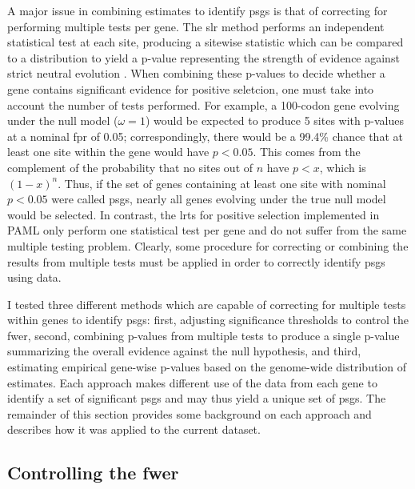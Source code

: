 A major issue in combining \sw estimates to identify \acp{psg} is that
of correcting for performing multiple \sw tests per gene. The \ac{slr}
method performs an independent statistical test at each site,
producing a sitewise statistic which can be compared to a \chisq
distribution to yield a p-value representing the strength of evidence
against strict neutral evolution \citep{Massingham2005}. When
combining these p-values to decide whether a gene contains significant
evidence for positive seletcion, one must take into account the number
of tests performed. For example, a 100-codon gene evolving under the
null model ($\omega=1$) would be expected to produce 5 sites with
p-values at a nominal \ac{fpr} of 0.05; correspondingly, there would
be a 99.4\% chance that at least one site within the gene would have
$p<0.05$. This comes from the complement of the probability that no
sites out of $n$ have $p<x$, which is $(1-x)^{n}$. Thus, if the set of
genes containing at least one site with nominal $p<0.05$ were called
\acp{psg}, nearly all genes evolving under the true null model would
be selected. In contrast, the \ac{lrt}s for positive selection
implemented in PAML only perform one statistical test per gene and do
not suffer from the same multiple testing problem. Clearly, some
procedure for correcting or combining the results from multiple tests
must be applied in order to correctly identify \acp{psg} using \sw
data.

I tested three different methods which are capable of correcting for
multiple \sw tests within genes to identify \acp{psg}: first,
adjusting significance thresholds to control the \ac{fwer}, second,
combining p-values from multiple tests to produce a single p-value
summarizing the overall evidence against the null hypothesis, and
third, estimating empirical gene-wise p-values based on the
genome-wide distribution of \sw estimates. Each approach makes
different use of the \sw data from each gene to identify a set of
significant \acp{psg} and may thus yield a unique set of
\acp{psg}. The remainder of this section provides some background on
each approach and describes how it was applied to the current dataset.

\subsection{Controlling the \ac{fwer}}

